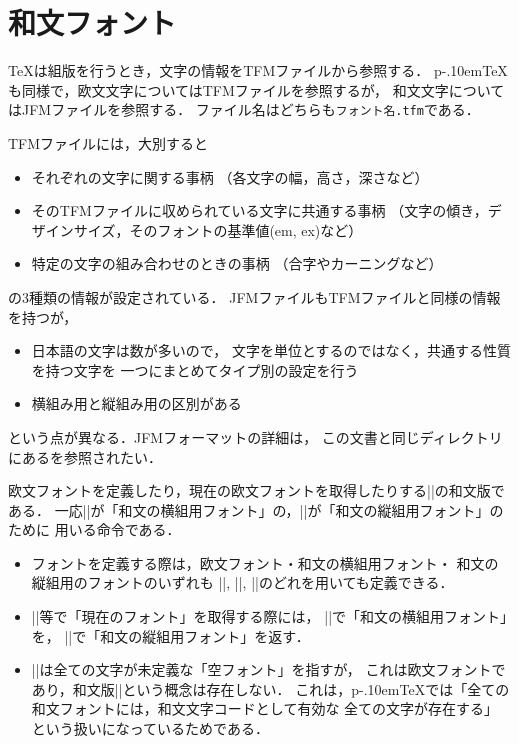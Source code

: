 \documentclass[a4paper,11pt,nomag]{jsarticle}
\def\code#1{\texttt{#1}}
\def\pTeX{p\kern-.10em\TeX}
\begin{document}
\section{和文フォント}
\label{sec:ptexfont}

\TeX は組版を行うとき，文字の情報をTFMファイルから参照する．
\pTeX も同様で，欧文文字についてはTFMファイルを参照するが，
和文文字についてはJFMファイルを参照する．
ファイル名はどちらも\code{フォント名.tfm}である．

TFMファイルには，大別すると
\begin{itemize}
 \item それぞれの文字に関する事柄
   （各文字の幅，高さ，深さなど）
 \item そのTFMファイルに収められている文字に共通する事柄
   （文字の傾き，デザインサイズ，そのフォントの基準値(em, ex)など）
 \item 特定の文字の組み合わせのときの事柄
   （合字やカーニングなど）
\end{itemize}
の3種類の情報が設定されている．
JFMファイルもTFMファイルと同様の情報を持つが，
\begin{itemize}
 \item 日本語の文字は数が多いので，
   文字を単位とするのではなく，共通する性質を持つ文字を
   一つにまとめてタイプ別の設定を行う
 \item 横組み用と縦組み用の区別がある
\end{itemize}
という点が異なる．JFMフォーマットの詳細は，
この文書と同じディレクトリにある\cite{jfm}を参照されたい．


\begin{cslist}
  欧文フォントを定義したり，現在の欧文フォントを取得したりする|\font|の和文版である．
  一応|\jfont|が「和文の横組用フォント」の，|\tfont|が「和文の縦組用フォント」のために
  用いる命令である．
\begin{itemize}
 \item フォントを定義する際は，欧文フォント・和文の横組用フォント・
       和文の縦組用のフォントのいずれも
       |\font|, |\jfont|, |\tfont|のどれを用いても定義できる．
 \item |\the|等で「現在のフォント」を取得する際には，
       |\jfont|で「和文の横組用フォント」を，
       |\tfont|で「和文の縦組用フォント」を返す．
 \item |\nullfont|は全ての文字が未定義な「空フォント」を指すが，
  これは欧文フォントであり，和文版|\nullfont|という概念は存在しない．
  これは，\pTeX では「全ての和文フォントには，和文文字コードとして有効な
  全ての文字が存在する」という扱いになっているためである．
\end{itemize}
\end{cslist}
\end{document}
